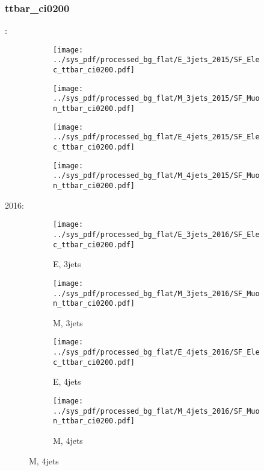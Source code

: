 \documentclass{beamer}
\begin{document}
\begin{frame}
\frametitle{ttbar_ci0200}
\fontsize{5}{1}:
\begin{figure}
\centering
\begin{subfigure}[b]{0.24\textwidth}
\texttt{[image: ../sys\_pdf/processed\_bg\_flat/E\_3jets\_2015/SF\_Elec\_ttbar\_ci0200.pdf]}
\end{subfigure}
\begin{subfigure}[b]{0.24\textwidth}
\texttt{[image: ../sys\_pdf/processed\_bg\_flat/M\_3jets\_2015/SF\_Muon\_ttbar\_ci0200.pdf]}
\end{subfigure}
\begin{subfigure}[b]{0.24\textwidth}
\texttt{[image: ../sys\_pdf/processed\_bg\_flat/E\_4jets\_2015/SF\_Elec\_ttbar\_ci0200.pdf]}
\end{subfigure}
\begin{subfigure}[b]{0.24\textwidth}
\texttt{[image: ../sys\_pdf/processed\_bg\_flat/M\_4jets\_2015/SF\_Muon\_ttbar\_ci0200.pdf]}
\end{subfigure}
\end{figure}
2016:
\begin{figure}
\centering
\begin{subfigure}[b]{0.24\textwidth}
\texttt{[image: ../sys\_pdf/processed\_bg\_flat/E\_3jets\_2016/SF\_Elec\_ttbar\_ci0200.pdf]}
\captionsetup{font=tiny}
\caption{E, 3jets}
\end{subfigure}
\begin{subfigure}[b]{0.24\textwidth}
\texttt{[image: ../sys\_pdf/processed\_bg\_flat/M\_3jets\_2016/SF\_Muon\_ttbar\_ci0200.pdf]}
\captionsetup{font=tiny}
\caption{M, 3jets}
\end{subfigure}
\begin{subfigure}[b]{0.24\textwidth}
\texttt{[image: ../sys\_pdf/processed\_bg\_flat/E\_4jets\_2016/SF\_Elec\_ttbar\_ci0200.pdf]}
\captionsetup{font=tiny}
\caption{E, 4jets}
\end{subfigure}
\begin{subfigure}[b]{0.24\textwidth}
\texttt{[image: ../sys\_pdf/processed\_bg\_flat/M\_4jets\_2016/SF\_Muon\_ttbar\_ci0200.pdf]}
\captionsetup{font=tiny}
\caption{M, 4jets}
\end{subfigure}
\end{figure}
\end{frame}
\end{document}
